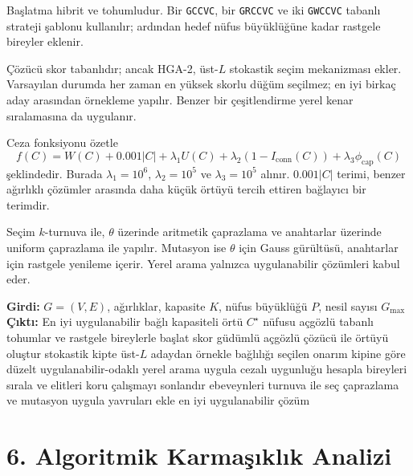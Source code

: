 \documentclass[11pt]{article}
\begin{document}
Başlatma hibrit ve tohumludur. Bir \texttt{GCCVC}, bir \texttt{GRCCVC} ve iki \texttt{GWCCVC} tabanlı strateji şablonu kullanılır; ardından hedef nüfus büyüklüğüne kadar rastgele bireyler eklenir.

Çözücü skor tabanlıdır; ancak HGA-2, üst-\(L\) stokastik seçim mekanizması ekler. Varsayılan durumda her zaman en yüksek skorlu düğüm seçilmez; en iyi birkaç aday arasından örnekleme yapılır. Benzer bir çeşitlendirme yerel kenar sıralamasına da uygulanır.

Ceza fonksiyonu özetle
\[
f(C)=W(C)+0.001|C|+\lambda_1U(C)+\lambda_2(1-I_{\mathrm{conn}}(C))+\lambda_3\phi_{\mathrm{cap}}(C)
\]
şeklindedir. Burada \(\lambda_1=10^6\), \(\lambda_2=10^5\) ve \(\lambda_3=10^5\) alınır. \(0.001|C|\) terimi, benzer ağırlıklı çözümler arasında daha küçük örtüyü tercih ettiren bağlayıcı bir terimdir.

Seçim \(k\)-turnuva ile, \(\theta\) üzerinde aritmetik çaprazlama ve anahtarlar üzerinde uniform çaprazlama ile yapılır. Mutasyon ise \(\theta\) için Gauss gürültüsü, anahtarlar için rastgele yenileme içerir. Yerel arama yalnızca uygulanabilir çözümleri kabul eder.

\begin{algorithm}[h]
\caption{HGA-2 / HGA-CCVC v2}
\begin{algorithmic}[1]
\State \textbf{Girdi:} \(G=(V,E)\), ağırlıklar, kapasite \(K\), nüfus büyüklüğü \(P\), nesil sayısı \(G_{\max}\)
\State \textbf{Çıktı:} En iyi uygulanabilir bağlı kapasiteli örtü \(C^{\star}\)
\State nüfusu açgözlü tabanlı tohumlar ve rastgele bireylerle başlat
        \State skor güdümlü açgözlü çözücü ile örtüyü oluştur
        \State stokastik kipte üst-\(L\) adaydan örnekle
        \State bağlılığı seçilen onarım kipine göre düzelt
        \State uygulanabilir-odaklı yerel arama uygula
        \State cezalı uygunluğu hesapla
    \EndFor
    \State bireyleri sırala ve elitleri koru
        \State çalışmayı sonlandır
    \EndIf
        \State ebeveynleri turnuva ile seç
        \State çaprazlama ve mutasyon uygula
        \State yavruları ekle
    \EndWhile
\EndFor
\State \Return en iyi uygulanabilir çözüm
\end{algorithmic}
\end{algorithm}

\section*{6. Algoritmik Karmaşıklık Analizi}
\end{document}
